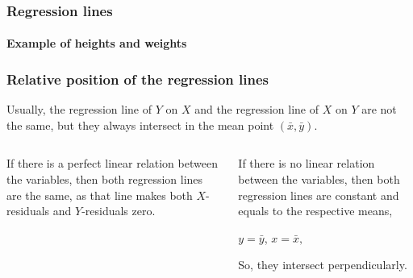 \begin{frame}
\frametitle{Regression lines}
\framesubtitle{Example of heights and weights}
\begin{center}
\end{center}
\end{frame}


\begin{frame}
\frametitle{Relative position of the regression lines}
Usually, the regression line of $Y$ on $X$ and the regression line of $X$
on $Y$ are not the same, but they always intersect in the mean point $(\bar x,\bar y)$.
\medskip
\begin{columns}[t]
\begin{column}{0.48\textwidth}
If there is a perfect linear relation between the variables, then both regression lines are the same, as that line
makes both $X$-residuals and $Y$-residuals zero.
\begin{center}
\end{center}
\end{column}
\begin{column}{0.48\textwidth}
If there is no linear relation between the variables, then both regression lines are constant and equals to the
respective means, 
\begin{center}
$y = \bar y$, \qquad $x = \bar x,$
\end{center}
So, they intersect perpendicularly.
\begin{center}
\end{center}
\end{column}
\end{columns}
\end{frame}


